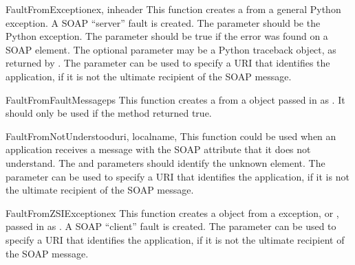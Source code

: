 \begin{funcdesc}{FaultFromException}{ex, inheader}
This function creates a  from a general Python exception.
A SOAP ``server'' fault is created.
The  parameter should be the Python exception.
The  parameter should be true if the error was
found on a SOAP  element.
The optional  parameter may be a Python traceback
object, as returned by .
The  parameter can be used to specify a URI that identifies the
application, if it is not the ultimate recipient of the SOAP message.
\end{funcdesc}

\begin{funcdesc}{FaultFromFaultMessage}{ps}
This function creates a  from a  object
passed in as .
It should only be used if the  method returned true.
\end{funcdesc}

\begin{funcdesc}{FaultFromNotUnderstood}{uri, localname,}
This function could be used when an application receives a message with
the SOAP  attribute that it does not understand.
The  and  parameters should identify
the unknown element.
The  parameter can be used to specify a URI that identifies the
application, if it is not the ultimate recipient of the SOAP message.
\end{funcdesc}

\begin{funcdesc}{FaultFromZSIException}{ex}
This function creates a  object from a \ZSI{} exception,
 or , passed in
as .
A SOAP ``client'' fault is created.
The  parameter can be used to specify a URI that identifies the
application, if it is not the ultimate recipient of the SOAP message.
\end{funcdesc}


